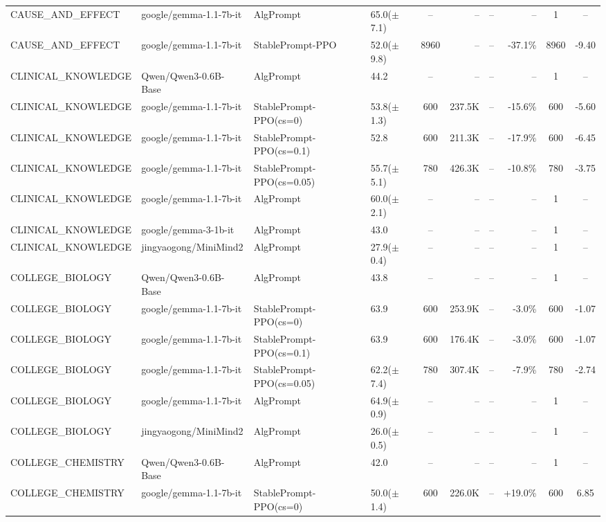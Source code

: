 {\begin{longtable}{@{}p{5.5cm}p{4.5cm}p{2.5cm}lcrrrcc@{}}
\midrule
CAUSE\_AND\_EFFECT & google/gemma-1.1-7b-it & AlgPrompt & 65.0($\pm$7.1) & -- & -- & -- & -- & 1 & -- \\
CAUSE\_AND\_EFFECT & google/gemma-1.1-7b-it & StablePrompt-PPO & 52.0($\pm$9.8) & 8960 & -- & -- & -37.1\% & 8960 & -9.40 \\
\midrule
CLINICAL\_KNOWLEDGE & Qwen/Qwen3-0.6B-Base & AlgPrompt & 44.2 & -- & -- & -- & -- & 1 & -- \\
\midrule
CLINICAL\_KNOWLEDGE & google/gemma-1.1-7b-it & StablePrompt-PPO(cs=0) & 53.8($\pm$1.3) & 600 & 237.5K & -- & -15.6\% & 600 & -5.60 \\
CLINICAL\_KNOWLEDGE & google/gemma-1.1-7b-it & StablePrompt-PPO(cs=0.1) & 52.8 & 600 & 211.3K & -- & -17.9\% & 600 & -6.45 \\
CLINICAL\_KNOWLEDGE & google/gemma-1.1-7b-it & StablePrompt-PPO(cs=0.05) & 55.7($\pm$5.1) & 780 & 426.3K & -- & -10.8\% & 780 & -3.75 \\
CLINICAL\_KNOWLEDGE & google/gemma-1.1-7b-it & AlgPrompt & 60.0($\pm$2.1) & -- & -- & -- & -- & 1 & -- \\
\midrule
CLINICAL\_KNOWLEDGE & google/gemma-3-1b-it & AlgPrompt & 43.0 & -- & -- & -- & -- & 1 & -- \\
\midrule
CLINICAL\_KNOWLEDGE & jingyaogong/MiniMind2 & AlgPrompt & 27.9($\pm$0.4) & -- & -- & -- & -- & 1 & -- \\
\midrule
COLLEGE\_BIOLOGY & Qwen/Qwen3-0.6B-Base & AlgPrompt & 43.8 & -- & -- & -- & -- & 1 & -- \\
\midrule
COLLEGE\_BIOLOGY & google/gemma-1.1-7b-it & StablePrompt-PPO(cs=0) & 63.9 & 600 & 253.9K & -- & -3.0\% & 600 & -1.07 \\
COLLEGE\_BIOLOGY & google/gemma-1.1-7b-it & StablePrompt-PPO(cs=0.1) & 63.9 & 600 & 176.4K & -- & -3.0\% & 600 & -1.07 \\
COLLEGE\_BIOLOGY & google/gemma-1.1-7b-it & StablePrompt-PPO(cs=0.05) & 62.2($\pm$7.4) & 780 & 307.4K & -- & -7.9\% & 780 & -2.74 \\
COLLEGE\_BIOLOGY & google/gemma-1.1-7b-it & AlgPrompt & 64.9($\pm$0.9) & -- & -- & -- & -- & 1 & -- \\
\midrule
COLLEGE\_BIOLOGY & jingyaogong/MiniMind2 & AlgPrompt & 26.0($\pm$0.5) & -- & -- & -- & -- & 1 & -- \\
\midrule
COLLEGE\_CHEMISTRY & Qwen/Qwen3-0.6B-Base & AlgPrompt & 42.0 & -- & -- & -- & -- & 1 & -- \\
\midrule
COLLEGE\_CHEMISTRY & google/gemma-1.1-7b-it & StablePrompt-PPO(cs=0) & 50.0($\pm$1.4) & 600 & 226.0K & -- & +19.0\% & 600 & 6.85 \\

\end{longtable}}
